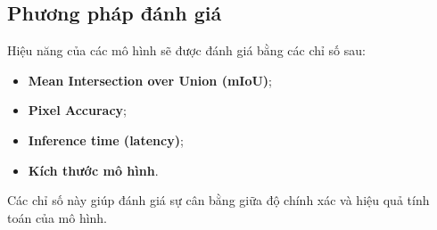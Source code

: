 \subsection{Phương pháp đánh giá}

Hiệu năng của các mô hình sẽ được đánh giá bằng các chỉ số sau:
\begin{itemize}
    \item \textbf{Mean Intersection over Union (mIoU)};
    \item \textbf{Pixel Accuracy};
    \item \textbf{Inference time (latency)};
    \item \textbf{Kích thước mô hình}.
\end{itemize}
Các chỉ số này giúp đánh giá sự cân bằng giữa độ chính xác và hiệu quả tính toán của mô hình.
